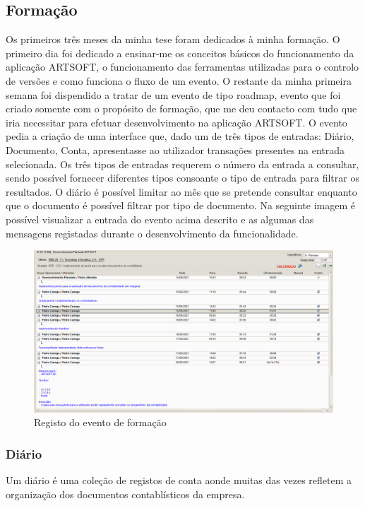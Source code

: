 \documentclass[sigplan]{acmart}
\begin{document}
\subsection{Formação}

Os primeiros três meses da minha tese foram dedicados à minha formação. O primeiro dia foi dedicado a ensinar-me os conceitos básicos do funcionamento da aplicação ARTSOFT, o funcionamento das ferramentas utilizadas para o controlo de versões e como funciona o fluxo de um evento. O restante da minha primeira semana foi dispendido a tratar de um evento de tipo roadmap, evento que foi criado somente com o propósito de formação, que me deu contacto com tudo que iria necessitar para efetuar desenvolvimento na aplicação ARTSOFT. O evento pedia a criação de uma interface que, dado um de três tipos de entradas: Diário, Documento, Conta, apresentasse ao utilizador transações presentes na entrada selecionada. Os três tipos de entradas requerem o número da entrada a consultar, sendo possível fornecer diferentes tipos consoante o tipo de entrada para filtrar os resultados. O diário é possível limitar ao mês que se pretende consultar enquanto que o documento é possível filtrar por tipo de documento. Na seguinte imagem é possível visualizar a entrada do evento acima descrito e as algumas das mensagens registadas durante o desenvolvimento da funcionalidade.
\begin{figure}[htbp]
	\centerline{\includegraphics[width=\linewidth]{figures/evento_formacao.png}}
	\caption{Registo do evento de formação}
	\label{fig2}
\end{figure}

\subsubsection{Diário}

Um diário é uma coleção de registos de conta aonde muitas das vezes refletem a organização dos documentos contablísticos da empresa.
\end{document}

